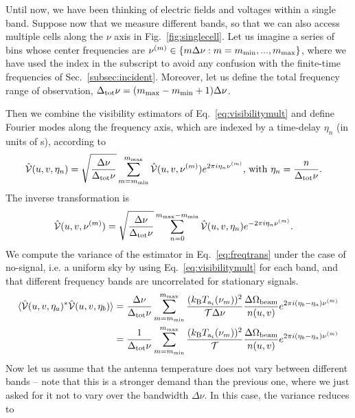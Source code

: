 \documentclass[11pt]{article}
\numberwithin{equation}{section}
\begin{document}
Until now, we have been thinking of electric fields and voltages within a single band. Suppose now that we measure different bands, so that we can also access multiple cells along the $\nu$ axis in Fig.~\ref{fig:singlecell}. Let us imagine a series of bins whose center frequencies are $\nu^{(m)} \in \{ m \Delta \nu: m = m_{\rm min}, ..., m_{\rm max} \}$, where we have used the index in the subscript to avoid any confusion with the finite-time frequencies of Sec.~\ref{subsec:incident}. Moreover, let us define the total frequency range of observation, $\Delta_{\rm tot} \nu = (m_{\rm max} - m_{\rm min} + 1) \Delta \nu$.

Then we combine the visibility estimators of Eq.~\eqref{eq:visibilitymult} and define Fourier modes along the frequency axis, which are indexed by a time-delay $\eta_n$ (in units of s), according to
\begin{align}
  \hat{\cal V}(u, v, \eta_n) & = \sqrt{ \frac{\Delta \nu}{\Delta_{\rm tot} \nu} } \sum_{m=m_{\rm min}}^{m_{\rm max}} \hat{\cal V}(u, v, \nu^{(m)}) e^{2\pi i \eta_n \nu^{(m)}} \mbox{,} \ {\rm with} \ \eta_n = \frac{n}{\Delta_{\rm tot} \nu} \mbox{.} \label{eq:freqtrans}
\end{align}
The inverse transformation is
\begin{align}
  \hat{\cal V}(u, v, \nu^{(m)}) & = \sqrt{\frac{\Delta \nu}{\Delta_{\rm tot} \nu}} \sum_{n=0}^{m_{\rm max} - m_{\rm min}} \hat{\cal V}(u, v, \eta_n) e^{-2\pi i \eta_n \nu^{(m)}} \mbox{.} 
\end{align}
We compute the variance of the estimator in Eq.~\eqref{eq:freqtrans} under the case of no-signal, i.e. a uniform sky by using Eq.~\eqref{eq:visibilitymult} for each band, and that different frequency bands are uncorrelated for stationary signals. 
\begin{align}
  \langle \hat{\cal V}(u, v, \eta_a)^\ast \hat{\cal V}(u, v, \eta_b) \rangle & = \frac{\Delta \nu}{\Delta_{\rm tot} \nu} \sum_{m=m_{\rm min}}^{m_{\rm max}} \frac{( k_{\rm B} T_{{\rm a}_i}(\nu_m) )^2}{{\cal T} \Delta \nu}  \frac{\Delta \Omega_{\rm beam}}{n(u, v)} e^{2\pi i (\eta_b - \eta_a) \nu^{(m)}} \notag \\
  & = \frac{1}{\Delta_{\rm tot} \nu} \sum_{m=m_{\rm min}}^{m_{\rm max}} \frac{( k_{\rm B} T_{{\rm a}_i}(\nu_m) )^2}{{\cal T}}  \frac{\Delta \Omega_{\rm beam}}{n(u, v)} e^{2\pi i (\eta_b - \eta_a) \nu^{(m)}}
\end{align}
Now let us assume that the antenna temperature does not vary between different bands -- note that this is a stronger demand than the previous one, where we just asked for it not to vary over the bandwidth $\Delta \nu$. In this case, the variance reduces to
\end{document}
